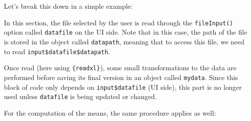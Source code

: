 \documentclass[
]{krantz}
\makeatletter
\newenvironment{Shaded}{\begin{snugshade}}{\end{snugshade}}
\newcommand{\AttributeTok}[1]{\textcolor[rgb]{0.61,0.61,0.61}{#1}}
\newcommand{\DecValTok}[1]{\textcolor[rgb]{0.06,0.06,0.06}{#1}}
\newcommand{\FunctionTok}[1]{\textcolor[rgb]{0,0,0}{#1}}
\newcommand{\NormalTok}[1]{#1}
\newcommand{\OtherTok}[1]{\textcolor[rgb]{0.37,0.37,0.37}{#1}}
\newcommand{\SpecialCharTok}[1]{\textcolor[rgb]{0,0,0}{#1}}
\newcommand{\StringTok}[1]{\textcolor[rgb]{0.5,0.5,0.5}{#1}}
\newenvironment{kframe}{%
\medskip{}
\setlength{\fboxsep}{.8em}
 \def\at@end@of@kframe{}%
 \ifinner\ifhmode%
  \def\at@end@of@kframe{\end{minipage}}%
  \begin{minipage}{\columnwidth}%
 \fi\fi%
 \def\FrameCommand##1{\hskip\@totalleftmargin \hskip-\fboxsep
 \colorbox{shadecolor}{##1}\hskip-\fboxsep
     \hskip-\linewidth \hskip-\@totalleftmargin \hskip\columnwidth}%
 \MakeFramed {\advance\hsize-\width
   \@totalleftmargin\z@ \linewidth\hsize
   \@setminipage}}%
 {\par\unskip\endMakeFramed%
 \at@end@of@kframe}
\renewenvironment{Shaded}{\begin{kframe}}{\end{kframe}}
\makeatother
\begin{document}
Let's break this down in a simple example:

\begin{Shaded}
\end{Shaded}

In this section, the file selected by the user is read through the \texttt{fileInput()} option called \texttt{datafile} on the UI side. Note that in this case, the path of the file is stored in the object called \texttt{datapath}, meaning that to access this file, we need to read \texttt{input\$datafile\$datapath}.

Once read (here using \texttt{\{readxl\}}), some small transformations to the data are performed before saving its final version in an object called \texttt{mydata}. Since this block of code only depends on \texttt{input\$datafile} (UI side), this part is no longer used unless \texttt{datafile} is being updated or changed.

For the computation of the means, the same procedure applies as well:
\end{document}
